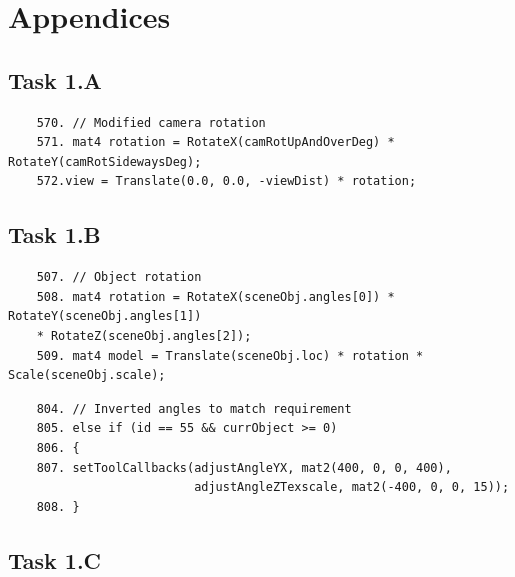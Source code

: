 \documentclass{article}
\begin{document}

\newpage


\section{Appendices}

\subsection{Task 1.A}\label{sec:1A}

\begin{commandline}
	\begin{verbatim}
	570. // Modified camera rotation
	571. mat4 rotation = RotateX(camRotUpAndOverDeg) * RotateY(camRotSidewaysDeg);
	572.view = Translate(0.0, 0.0, -viewDist) * rotation;
	\end{verbatim}
\end{commandline}

\subsection{Task 1.B}\label{sec:1B}

\begin{commandline}
	\begin{verbatim}
	507. // Object rotation
	508. mat4 rotation = RotateX(sceneObj.angles[0]) * RotateY(sceneObj.angles[1])
	* RotateZ(sceneObj.angles[2]);
	509. mat4 model = Translate(sceneObj.loc) * rotation * Scale(sceneObj.scale);
	\end{verbatim}
\end{commandline} 

\begin{commandline}
	\begin{verbatim}
	804. // Inverted angles to match requirement
	805. else if (id == 55 && currObject >= 0)
	806. {
	807. setToolCallbacks(adjustAngleYX, mat2(400, 0, 0, 400),
	                      adjustAngleZTexscale, mat2(-400, 0, 0, 15));
	808. }
	\end{verbatim}
\end{commandline}

\subsection{Task 1.C}\label{sec:1C}
\end{document}
